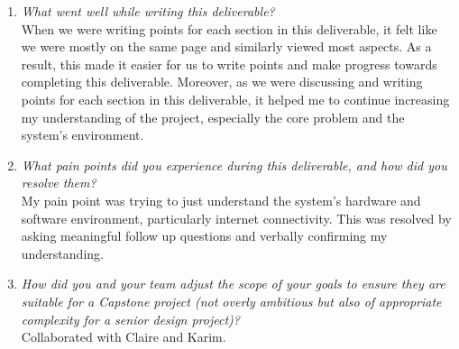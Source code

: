 \documentclass{article}
\begin{document}
\begin{enumerate}
    \item \textit{What went well while writing this deliverable?}\\
     When we were writing points for each section in this deliverable, it felt like we were mostly on the same page and similarly viewed most aspects. As a result, this made it easier for us to write points and make progress towards completing this deliverable. Moreover, as we were discussing and writing points for each section
     in this deliverable, it helped me to continue increasing my understanding of the project, especially the core problem and the system's environment.
     
    \item \textit{What pain points did you experience during this deliverable, and how
    did you resolve them?}\\
    My pain point was trying to just understand the system's hardware and software environment, particularly 
    internet connectivity. This was resolved by asking meaningful follow up questions and verbally confirming my understanding.

    \item \textit{How did you and your team adjust the scope of your goals to ensure
    they are suitable for a Capstone project (not overly ambitious but also of
    appropriate complexity for a senior design project)?}\\
    Collaborated with Claire and Karim. 
\end{enumerate}  
\end{document}
